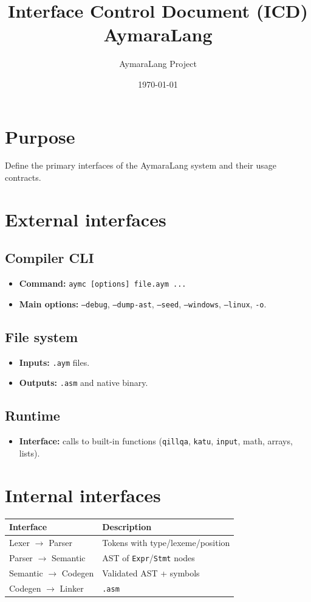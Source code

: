 \documentclass[11pt,a4paper]{article}
\title{Interface Control Document (ICD)\\AymaraLang}
\author{AymaraLang Project}
\date{\today}
\begin{document}
\maketitle

\section{Purpose}
Define the primary interfaces of the AymaraLang system and their usage contracts.

\section{External interfaces}
\subsection{Compiler CLI}
\begin{itemize}
    \item \textbf{Command:} \texttt{aymc [options] file.aym ...}
    \item \textbf{Main options:} \texttt{--debug}, \texttt{--dump-ast}, \texttt{--seed}, \texttt{--windows}, \texttt{--linux}, \texttt{-o}.
\end{itemize}

\subsection{File system}
\begin{itemize}
    \item \textbf{Inputs:} \texttt{.aym} files.
    \item \textbf{Outputs:} \texttt{.asm} and native binary.
\end{itemize}

\subsection{Runtime}
\begin{itemize}
    \item \textbf{Interface:} calls to built-in functions (\texttt{qillqa}, \texttt{katu}, \texttt{input}, math, arrays, lists).
\end{itemize}

\section{Internal interfaces}
\begin{longtable}{@{}p{4cm}p{9cm}@{}}
\toprule
\textbf{Interface} & \textbf{Description} \\ \midrule
Lexer $\rightarrow$ Parser & Tokens with type/lexeme/position \\
Parser $\rightarrow$ Semantic & AST of \texttt{Expr}/\texttt{Stmt} nodes \\
Semantic $\rightarrow$ Codegen & Validated AST + symbols \\
Codegen $\rightarrow$ Linker & \texttt{.asm} \\ \bottomrule
\end{longtable}
\end{document}
